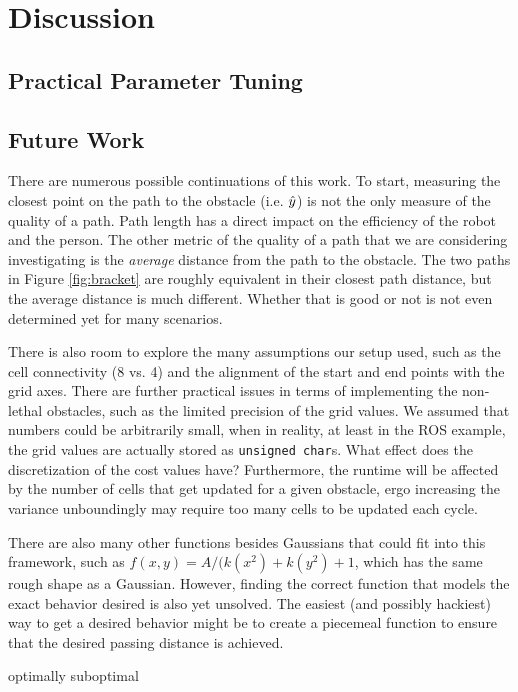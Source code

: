 \section{Discussion}
\subsection{Practical Parameter Tuning}
\subsection{Future Work}
There are numerous possible continuations of this work. To start, measuring the closest point on the path to the obstacle (i.e. $\hat{y}$) is not the only measure of the quality of a path. Path length has a direct impact on the efficiency of the robot and the person. The other metric of the quality of a path that we are considering investigating is the \emph{average} distance from the path to the obstacle. The two paths in Figure \ref{fig:bracket} are roughly equivalent in their closest path distance, but the average distance is much different. Whether that is good or not is not even determined yet for many scenarios. 

There is also room to explore the many assumptions our setup used, such as the cell connectivity (8 vs. 4) and the alignment of the start and end points with the grid axes. There are further practical issues in terms of implementing the non-lethal obstacles, such as the limited precision of the grid values. We assumed that numbers could be arbitrarily small, when in reality, at least in the ROS example, the grid values are actually stored as \texttt{unsigned char}s. What effect does the discretization of the cost values have? Furthermore, the runtime will be affected by the number of cells that get updated for a given obstacle, ergo increasing the variance unboundingly may require too many cells to be updated each cycle. 

There are also many other functions besides Gaussians that could fit into this framework, such as $f(x,y) = A/(k(x^2) + k(y^2) + 1$, which has the same rough shape as a Gaussian. However, finding the correct function that models the exact behavior desired is also yet unsolved. The easiest (and possibly hackiest) way to get a desired behavior might be to create a piecemeal function to ensure that the desired passing distance is achieved. 


optimally suboptimal

